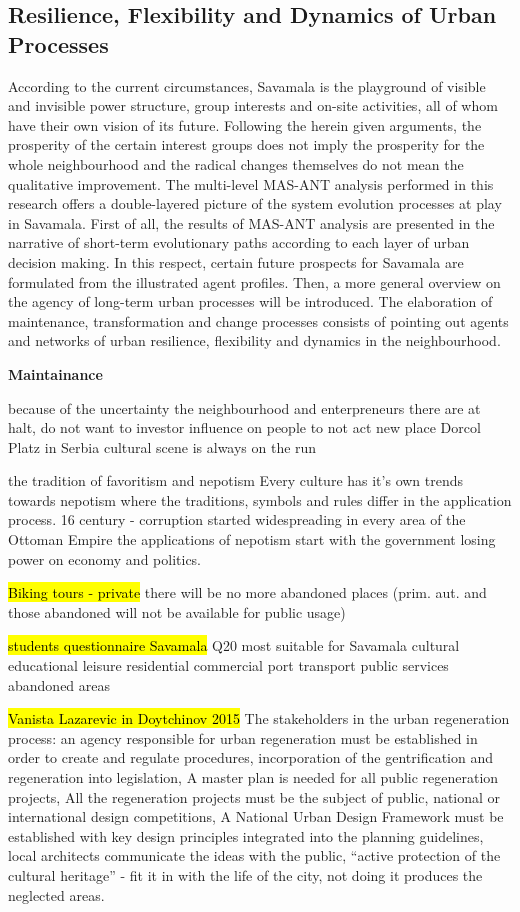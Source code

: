 \documentclass[11pt]{report}
\begin{document}
\subsection{Resilience, Flexibility and Dynamics of Urban Processes}

According to the current circumstances, Savamala is the playground of 
visible and invisible power structure, group interests and on-site activities, all of whom have their own vision of its future.
Following the herein given arguments, the prosperity of the certain interest groups does not imply the prosperity for the whole neighbourhood and the radical changes themselves do not mean the qualitative improvement.
The multi-level MAS-ANT analysis performed in this research offers a double-layered picture of the system evolution processes at play in Savamala.
First of all, the results of MAS-ANT analysis are presented in the narrative of short-term evolutionary paths according to each layer of urban decision making. In this respect, certain future prospects for Savamala are formulated from the illustrated agent profiles.
Then, a more general overview on the agency of long-term urban processes will be introduced. The elaboration of maintenance, transformation and change processes consists of pointing out agents and networks of urban resilience, flexibility and dynamics in the neighbourhood.

\textbf{Maintainance}

because of the uncertainty the neighbourhood and enterpreneurs there are at halt, do not want to investor
influence on people to not act
new place Dorcol Platz
in Serbia cultural scene is always on the run

\cite{Çarikçi et al.2009}
the tradition of favoritism and nepotism
Every  culture  has  it’s  own  trends  towards  nepotism  where  the traditions, symbols and rules differ in the application process.
16 century - corruption started widespreading in every area of the Ottoman Empire
the applications of nepotism start with the government losing power on economy and politics.

\hl{Biking tours - private}
there will be no more abandoned places (prim. aut. and those abandoned will not be available for public usage)

\hl{students questionnaire Savamala}
Q20 most suitable for Savamala
cultural
educational
leisure
residential
commercial
port
transport
public services
abandoned areas

\hl{Vanista Lazarevic in Doytchinov 2015}
The stakeholders in the urban regeneration process:
an agency responsible for urban regeneration must be established in order to create and regulate procedures, 
incorporation of the gentrification and regeneration into legislation,
A master plan is needed for all public regeneration projects,
All the regeneration projects must be the subject of public, national or international design competitions,
A National Urban Design Framework must be established with key design principles integrated into the planning guidelines,
local architects communicate the ideas with the public,
“active protection of the cultural heritage” - fit it in with the life of the city, not doing it produces the neglected areas.
\end{document}
